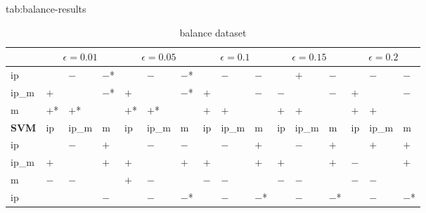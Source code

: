 \begin{table}[htbp]
\scriptsize
\floatconts
  {tab:balance-results}%
  {\caption{balance dataset}}%
  {
\begin{tabular}{l|lll|lll|lll|lll|lll}
             & \multicolumn{3}{c|}{$\epsilon=0.01$} & \multicolumn{3}{c|}{$\epsilon=0.05$} & \multicolumn{3}{c|}{$\epsilon=0.1$} & \multicolumn{3}{c|}{$\epsilon=0.15$} & \multicolumn{3}{c}{$\epsilon=0.2$} \\
\hline
\hline
ip           &            & $-$        & $-$*       &            & $-$        & $-$*       &            & $-$        & $-$        &            & $+$        & $-$        &            & $-$        & $-$         \\
ip\_m        & $+$        &            & $-$*       & $+$        &            & $-$*       & $+$        &            & $-$        & $-$        &            & $-$        & $+$        &            & $-$         \\
m            & $+$*       & $+$*       &            & $+$*       & $+$*       &            & $+$        & $+$        &            & $+$        & $+$        &            & $+$        & $+$        &             \\
\hline
\textbf{SVM} & ip         & ip\_m      & m          & ip         & ip\_m      & m          & ip         & ip\_m      & m          & ip         & ip\_m      & m          & ip         & ip\_m      & m           \\
\hline
ip           &            & $-$        & $+$        &            & $-$        & $-$        &            & $-$        & $+$        &            & $-$        & $+$        &            & $+$        & $+$         \\
ip\_m        & $+$        &            & $+$        & $+$        &            & $+$        & $+$        &            & $+$        & $+$        &            & $+$        & $-$        &            & $+$         \\
m            & $-$        & $-$        &            & $+$        & $-$        &            & $-$        & $-$        &            & $-$        & $-$        &            & $-$        & $-$        &             \\
\hline
\hline
ip           &            &            & $-$        &            & $-$        & $-$*       &            & $-$        & $-$*       &            & $-$        & $-$*       &            & $-$        & $-$*        \\

\end{tabular}}
\end{table}
